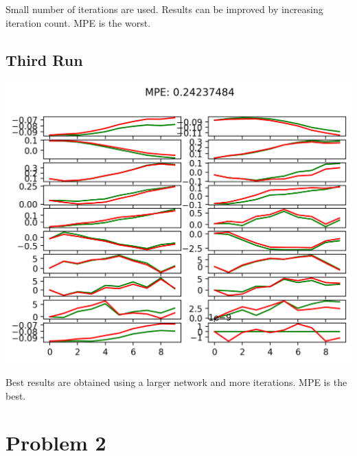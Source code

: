 \documentclass[11pt]{article}
\begin{document}
    Small number of iterations are used.
    Results can be improved by increasing iteration count.
    MPE is the worst.

    \subsection*{Third Run}

    \includegraphics[scale=0.9]{q1/itr_0_predictions_run2}

    Best results are obtained using a larger network and more iterations.
    MPE is the best.

    \section*{Problem 2}
\end{document}
